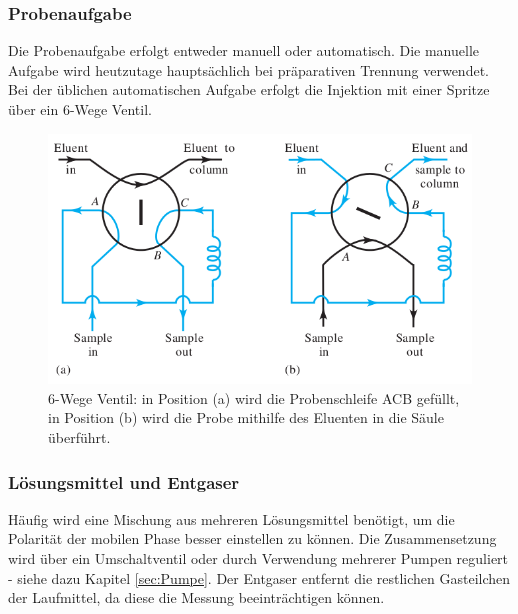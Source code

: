      \subsubsection{Probenaufgabe}
       
       Die Probenaufgabe erfolgt entweder manuell oder automatisch. Die manuelle Aufgabe wird heutzutage hauptsächlich bei präparativen Trennung verwendet. Bei der üblichen automatischen Aufgabe erfolgt die Injektion mit einer Spritze über ein 6-Wege Ventil. \citep{SkriptHPLC}
       
         \begin{figure}[H]
           \includegraphics[scale=0.3, center]{images/Funktionsweise6WegeVentil.png} 
           \caption[Beschreibung der Funktionsweise des 6-Wege Ventil, Quelle: \citep{InstrumentelleAnalytikSkoog}]{6-Wege Ventil: in Position (a) wird die Probenschleife ACB gefüllt, in Position (b) wird die Probe mithilfe des Eluenten in die Säule überführt.}
           \label{fig:SechsWegeVentil}
         \end{figure}
         
     \subsubsection{Lösungsmittel und Entgaser}
       
       Häufig wird eine Mischung aus mehreren Lösungsmittel benötigt, um die Polarität der mobilen Phase besser einstellen zu können. Die Zusammensetzung wird über ein Umschaltventil oder durch Verwendung mehrerer Pumpen reguliert - siehe dazu Kapitel \ref{sec:Pumpe}. Der Entgaser entfernt die restlichen Gasteilchen der Laufmittel, da diese die Messung beeinträchtigen können. \citep[S. 749]{InstrumentelleAnalytikSkoog}
       
